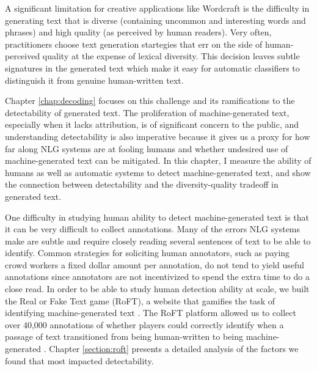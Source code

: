A significant limitation for creative applications like Wordcraft is the difficulty in generating text that is diverse (containing uncommon and interesting words and phrases) and high quality (as perceived by human readers).
Very often, practitioners choose text generation startegies that err on the side of human-perceived quality at the expense of lexical diversity.
This decision leaves subtle signatures in the generated text which make it easy for automatic classifiers to distinguish it from genuine human-written text.

Chapter \ref{chap:decoding} focuses on this challenge and its ramifications to the detectability of generated text.
The proliferation of machine-generated text, especially when it lacks attribution, is of significant concern to the public, and understanding detectability is also imperative because it gives us a proxy for how far along NLG systems are at fooling humans and whether undesired use of machine-generated text can be mitigated.
In this chapter, I measure the ability of humans as well as automatic systems to detect machine-generated text, and show the connection between detectability and the diversity-quality tradeoff in generated text.


One difficulty in studying human ability to detect machine-generated text is that it can be very difficult to collect annotations.
Many of the errors NLG systems make are subtle and require closely reading several sentences of text to be able to identify.
Common strategies for soliciting human annotators, such as paying crowd workers a fixed dollar amount per annotation, do not tend to yield useful annotations since annotators are not incentivized to spend the extra time to do a close read.
In order to be able to study human detection ability at scale, we built the Real or Fake Text game (RoFT), a website that gamifies the task of identifying machine-generated text \citep{dugan2020roft}.
The RoFT platform allowed us to collect over 40,000 annotations of whether players could correctly identify when a passage of text transitioned from being human-written to being machine-generated .
Chapter \ref{section:roft} presents a detailed analysis of the factors we found that most impacted detectability. 
 
